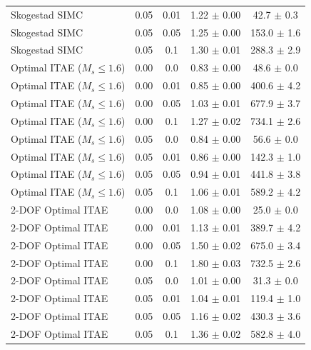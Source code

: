 \begin{table}[t]
{\begin{tabular}{lcccc}
Skogestad SIMC & 0.05 & 0.01 & 1.22 $\pm$ 0.00 & 42.7 $\pm$ 0.3 \\
Skogestad SIMC & 0.05 & 0.05 & 1.25 $\pm$ 0.00 & 153.0 $\pm$ 1.6 \\
Skogestad SIMC & 0.05 & 0.1 & 1.30 $\pm$ 0.01 & 288.3 $\pm$ 2.9 \\
Optimal ITAE ($M_s \leq 1.6$) & 0.00 & 0.0 & 0.83 $\pm$ 0.00 & 48.6 $\pm$ 0.0 \\
Optimal ITAE ($M_s \leq 1.6$) & 0.00 & 0.01 & 0.85 $\pm$ 0.00 & 400.6 $\pm$ 4.2 \\
Optimal ITAE ($M_s \leq 1.6$) & 0.00 & 0.05 & 1.03 $\pm$ 0.01 & 677.9 $\pm$ 3.7 \\
Optimal ITAE ($M_s \leq 1.6$) & 0.00 & 0.1 & 1.27 $\pm$ 0.02 & 734.1 $\pm$ 2.6 \\
Optimal ITAE ($M_s \leq 1.6$) & 0.05 & 0.0 & 0.84 $\pm$ 0.00 & 56.6 $\pm$ 0.0 \\
Optimal ITAE ($M_s \leq 1.6$) & 0.05 & 0.01 & 0.86 $\pm$ 0.00 & 142.3 $\pm$ 1.0 \\
Optimal ITAE ($M_s \leq 1.6$) & 0.05 & 0.05 & 0.94 $\pm$ 0.01 & 441.8 $\pm$ 3.8 \\
Optimal ITAE ($M_s \leq 1.6$) & 0.05 & 0.1 & 1.06 $\pm$ 0.01 & 589.2 $\pm$ 4.2 \\
2-DOF Optimal ITAE & 0.00 & 0.0 & 1.08 $\pm$ 0.00 & 25.0 $\pm$ 0.0 \\
2-DOF Optimal ITAE & 0.00 & 0.01 & 1.13 $\pm$ 0.01 & 389.7 $\pm$ 4.2 \\
2-DOF Optimal ITAE & 0.00 & 0.05 & 1.50 $\pm$ 0.02 & 675.0 $\pm$ 3.4 \\
2-DOF Optimal ITAE & 0.00 & 0.1 & 1.80 $\pm$ 0.03 & 732.5 $\pm$ 2.6 \\
2-DOF Optimal ITAE & 0.05 & 0.0 & 1.01 $\pm$ 0.00 & 31.3 $\pm$ 0.0 \\
2-DOF Optimal ITAE & 0.05 & 0.01 & 1.04 $\pm$ 0.01 & 119.4 $\pm$ 1.0 \\
2-DOF Optimal ITAE & 0.05 & 0.05 & 1.16 $\pm$ 0.02 & 430.3 $\pm$ 3.6 \\
2-DOF Optimal ITAE & 0.05 & 0.1 & 1.36 $\pm$ 0.02 & 582.8 $\pm$ 4.0 \\
\bottomrule
\end{tabular}%
}
\end{table}
